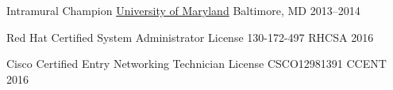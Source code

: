 

\begin{cvhonors}

  \cvhonor
    {Intramural Champion} %
	{\href{umaryland.edu}{University of Maryland}}
    {Baltimore, MD}
    {2013--2014}


    \cvhonor
    {Red Hat Certified System Administrator}
    {License 130-172-497}
    {RHCSA}
    {2016}

  \cvhonor
    {Cisco Certified Entry Networking Technician}
    {License CSCO12981391}
    {CCENT}
    {2016}

\end{cvhonors}

